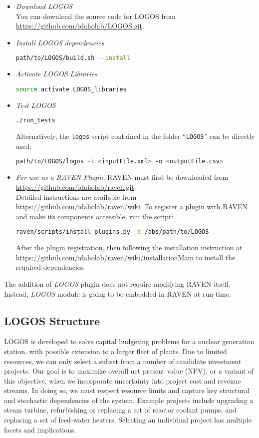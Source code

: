\begin{itemize}
  \item \textit{Download LOGOS}
    \\ You can download the source code for LOGOS from \url{https://github.com/idaholab/LOGOS.git}.
  \item \textit{Install LOGOS dependencies}
	\begin{lstlisting}[language=bash]
	path/to/LOGOS/build.sh --install
	\end{lstlisting}
  \item \textit{Activate LOGOS Libraries}
  \begin{lstlisting}[language=bash]
  source activate LOGOS_libraries
  \end{lstlisting}
  \item \textit{Test LOGOS}
	\begin{lstlisting}[language=bash]
	./run_tests
	\end{lstlisting}
  	Alternatively, the \texttt{logos} script
    contained in the folder ``\texttt{LOGOS}'' can be directly used:
\begin{lstlisting}[language=bash]
path/to/LOGOS/logos -i <inputFile.xml> -o <outputFile.csv>
\end{lstlisting}
	\item \textit{For use as a RAVEN Plugin}, RAVEN must first be downloaded from
  \url{https://github.com/idaholab/raven.git}.
		\\ Detailed instructions are available from \url{https://github.com/idaholab/raven/wiki}.
    To register a plugin with RAVEN and make its components accessible, run the script:
    \begin{lstlisting}[language=bash]
  	raven/scripts/install_plugins.py -s /abs/path/to/LOGOS
  	\end{lstlisting}
    After the plugin registration, then following the installation instruction at
    \url{https://github.com/idaholab/raven/wiki/installationMain} to install the
    required dependencies.
\end{itemize}

The addition of \textit{LOGOS} plugin does not require modifying RAVEN
itself. Instead, \textit{LOGOS} module is going to be embedded in
RAVEN at run-time.

\subsection{LOGOS Structure}
LOGOS is developed to solve capital budgeting problems for a nuclear generation station,
with possible extension to a larger fleet of plants. Due to limited resources, we can
only select a subset from a number of candidate investment projects. Our goal is to
maximize overall net present value (NPV), or a variant of this objective, when we
incorporate uncertainty into project cost and revenue streams. In doing so, we must
respect resource limits and capture key structural and stochastic dependencies of
the system. Example projects include upgrading a steam turbine, refurbishing or replacing
a set of reactor coolant pumps, and replacing a set of feed-water heaters. Selecting an
individual project has multiple facets and implications.

